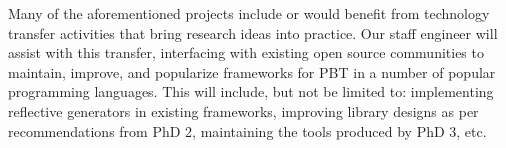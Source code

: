 

\smallskip{}
%
Many of the aforementioned projects include or would benefit from technology transfer activities that bring research ideas into practice. Our staff engineer will assist with this transfer, interfacing with existing open source communities to maintain, improve, and popularize frameworks for PBT in a number of popular programming languages. This will include, but not be limited to: implementing reflective generators in existing frameworks, improving library designs as per recommendations from PhD 2, maintaining the tools produced by PhD 3, etc.



